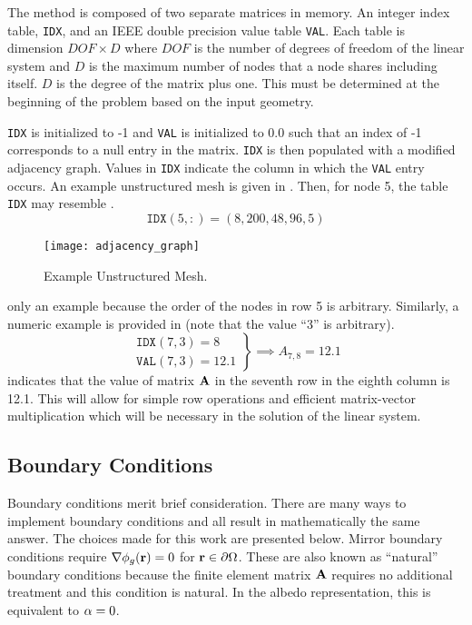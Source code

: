     The \twotable method is composed of two separate matrices in memory. An 
    integer index table, \texttt{IDX}, and an IEEE double precision value table
    \texttt{VAL}. Each table is dimension $DOF \times D$ where $DOF$ is the
    number of degrees of freedom of the linear system and $D$ is the maximum
    number of nodes that a node shares including itself. $D$ is the degree of
    the matrix plus one. This must be determined at the beginning of the
    problem based on the input geometry.
    
    \texttt{IDX} is initialized to -1 and \texttt{VAL} is initialized 
    to 0.0 such that an index of -1 corresponds to a null entry in the 
    matrix. \texttt{IDX} is then populated with a modified adjacency graph. 
    Values in \texttt{IDX} indicate the column in which the \texttt{VAL} entry
    occurs. An example unstructured mesh is given in . 
    Then, for node 5, the table \texttt{IDX} may resemble .
    \begin{equation}
      \label{eq:idx_example}
      \texttt{IDX}(5,:) = (8, 200, 48, 96, 5 )
    \end{equation}
    \begin{figure}
      \centering
      \texttt{[image: adjacency\_graph]}
      \caption{Example Unstructured Mesh.}
      \label{fig:adjacency_graph}
    \end{figure}
     only an example because the order of the nodes in row
    5 is arbitrary. Similarly, a numeric example is provided in 
     (note that the value ``3'' is arbitrary).
    \begin{equation}
      \label{eq:idx_number}
      \left.
      \begin{array}{c}
        \texttt{IDX}(7,3) = 8 \\
        \texttt{VAL}(7,3) = 12.1
      \end{array}
      \right\}
      \implies
      A_{7,8} = 12.1
    \end{equation}
     indicates that the value of matrix $\mathbf{A}$ in the
    seventh row in the eighth column is 12.1. This will allow for simple row 
    operations and efficient matrix-vector multiplication which will be 
    necessary in the solution of the linear system.

  \subsection{Boundary Conditions}
    \label{sec:boundary_conditions}
    Boundary conditions merit brief consideration. There are many ways to 
    implement boundary conditions and all result in mathematically the same 
    answer. The choices made for this work are presented below. Mirror 
    boundary conditions require $\mathbf{\nabla} \phi_g(\mathbf{r}) = 0$ for 
    $\mathbf{r} \in \partial \Omega$. These are also known as ``natural'' boundary
    conditions because the finite element matrix $\mathbf{A}$ requires no additional 
    treatment and this condition is natural. In the albedo representation, this
    is equivalent to $\alpha = 0$.
    

